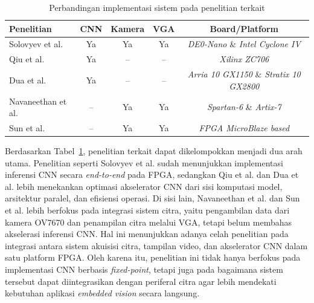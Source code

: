 \begin{table}[ht]
    \centering
    \caption{Perbandingan implementasi sistem pada penelitian terkait}
    \label{tab:comparison_system}
    \begin{tabular}{|l|c|c|c|c|}
        \hline
            \textbf{Penelitian} &
            \textbf{CNN} &
            \textbf{Kamera} &
            \textbf{VGA} &
            \textbf{Board/Platform}
            \\ \hline
            Solovyev et al. \cite{Solovyev2019FixedPointCNN} &
            Ya &
            Ya &
            Ya &
            \emph{DE0-Nano} \& \emph{Intel Cyclone IV}
            \\ \hline
            Qiu et al. \cite{Qiu2016GoingDeeperFPGA} &
            Ya &
            -- &
            -- &
            \emph{Xilinx ZC706}
            \\ \hline
            Dua et al. \cite{Dua2020SystolicCNN} &
            Ya &
            -- &
            -- &
            \emph{Arria 10 GX1150} \& \emph{Stratix 10 GX2800}
            \\ \hline
            Navaneethan et al. \cite{Navaneethan2022OV7670VGA} &
            -- &
            Ya &
            Ya &
            \emph{Spartan-6} \& \emph{Artix-7}
            \\ \hline
            Sun et al. \cite{Sun2021MicroBlazeVideoProcessing} &
            -- &
            Ya &
            Ya &
            \emph{FPGA MicroBlaze based}
            \\ \hline
    \end{tabular}
\end{table}

Berdasarkan Tabel~\ref{tab:comparison_system}, penelitian terkait dapat dikelompokkan
menjadi dua arah utama. Penelitian seperti Solovyev et al. sudah menunjukkan
implementasi inferensi CNN secara \emph{end-to-end} pada FPGA, sedangkan Qiu et al.
dan Dua et al. lebih menekankan optimasi akselerator CNN dari sisi komputasi model,
arsitektur paralel, dan efisiensi operasi. Di sisi lain, Navaneethan et al. dan Sun et
al. lebih berfokus pada integrasi sistem citra, yaitu pengambilan data dari kamera
OV7670 dan penampilan citra melalui VGA, tetapi belum membahas akselerasi inferensi CNN.
Hal ini menunjukkan adanya celah penelitian pada integrasi antara sistem akuisisi
citra, tampilan video, dan akselerator CNN dalam satu platform FPGA. Oleh karena itu,
penelitian ini tidak hanya berfokus pada implementasi CNN berbasis \emph{fixed-point},
tetapi juga pada bagaimana sistem tersebut dapat diintegrasikan dengan periferal
citra agar lebih mendekati kebutuhan aplikasi \emph{embedded vision} secara langsung.


